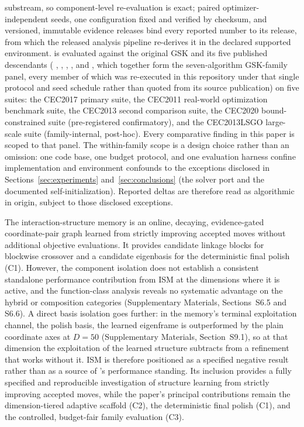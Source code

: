 \begin{itemize}[leftmargin=*,labelsep=4.9mm]
  substream, so component-level re-evaluation is exact; paired optimizer-independent seeds, one
  configuration fixed and verified by checksum, and versioned, immutable
  evidence releases
  bind every reported number to its release, from which the released
  analysis pipeline re-derives it in the declared supported environment. \dtgsk{} is evaluated
  against the original GSK and its five published descendants (%
  \agsk{}, \apgsk{}, \fdbagsk{}, \egsk{}, and \atmals{}, which together
  form the seven-algorithm GSK-family panel, every member of which was re-executed
  in this repository under that single protocol and seed schedule rather
  than quoted from its source publication) on five suites: the CEC2017
  primary suite, the CEC2011 real-world optimization benchmark suite, the
  CEC2013 second comparison suite, the CEC2020 bound-constrained suite
  (pre-registered confirmatory), and the CEC2013LSGO large-scale suite
  (family-internal, post-hoc). Every comparative finding in this paper is scoped to that
  panel. The within-family scope is a design choice rather than an
  omission: one code base, one budget protocol, and one evaluation
  harness confine implementation and environment confounds to the
  exceptions disclosed in Sections~\ref{sec:experiments}
  and~\ref{sec:conclusions} (the \egsk{} solver port and the documented
  self-initialization). Reported deltas are therefore read as algorithmic
  in origin, subject to those disclosed exceptions. %
\end{itemize}

The interaction-structure memory is an online, decaying, evidence-gated coordinate-pair graph learned from strictly improving accepted moves without additional objective evaluations. It provides candidate linkage blocks for blockwise crossover and a candidate eigenbasis for the deterministic final polish (C1). However, the component isolation does not establish a consistent standalone performance contribution from ISM at the dimensions where it is active, and the function-class analysis reveals no systematic advantage on the hybrid or composition categories (Supplementary Materials, Sections~S6.5 and S6.6). A direct basis isolation goes further: in the memory's terminal exploitation channel, the polish basis, the learned eigenframe is outperformed by the plain coordinate axes at $D = 50$ (Supplementary Materials, Section~S9.1), so at that dimension the exploitation of the learned structure subtracts from a refinement that works without it. ISM is therefore positioned as a specified negative result rather than as a source of \dtgsk{}'s performance standing. Its inclusion provides a fully specified and reproducible investigation of structure learning from strictly improving accepted moves, while the paper's principal contributions remain the dimension-tiered adaptive scaffold (C2), the deterministic final polish (C1), and the controlled, budget-fair family evaluation (C3).

